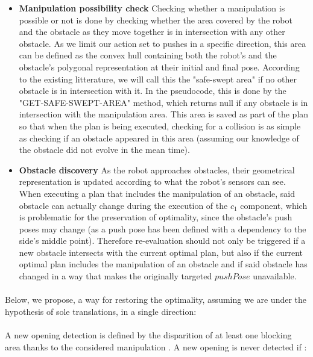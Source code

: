 \begin{itemize}
  \item \textbf{Manipulation possibility check} Checking whether a manipulation is possible or not is done by checking whether the area covered by the robot and the obstacle as they move together is in intersection with any other obstacle. As we limit our action set to pushes in a specific direction, this area can be defined as the convex hull containing both the robot's and the obstacle's polygonal representation at their initial and final pose. According to the existing litterature, we will call this the "safe-swept area" if no other obstacle is in intersection with it. In the pseudocode, this is done by the "GET-SAFE-SWEPT-AREA" method, which returns null if any obstacle is in intersection with the manipulation area. This area is saved as part of the plan so that when the plan is being executed, checking for a collision is as simple as checking if an obstacle appeared in this area (assuming our knowledge of the obstacle did not evolve in the mean time).
  \item \textbf{Obstacle discovery} As the robot approaches obstacles, their geometrical representation is updated according to what the robot's sensors can see. When executing a plan that includes the manipulation of an obstacle, said obstacle can actually change during the execution of the $c_{1}$ component, which is problematic for the preservation of optimality, since the obstacle's push poses may change (as a push pose has been defined with a dependency to the side's middle point). Therefore re-evaluation should not only be triggered if a new obstacle intersects with the current optimal plan, but also if the current optimal plan includes the manipulation of an obstacle and if said obstacle has changed in a way that makes the originally targeted $pushPose$ unavailable.
\end{itemize}

\paragraph{}\label{check_opening_solution} Below, we propose, a way for restoring the optimality, assuming we are under the hypothesis of sole translations, in a single direction:

\paragraph{} A new opening detection is defined by the disparition of at least one blocking area thanks to the considered manipulation \parencite{levihn_efficient_2011}. A new opening is never detected if :

